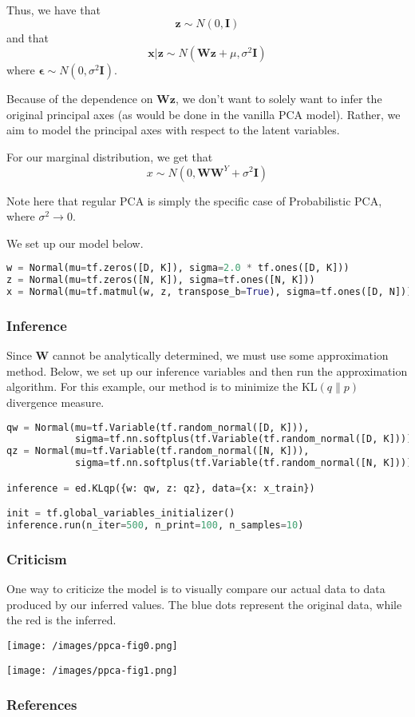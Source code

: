 Thus, we have that $$\mathbf{z} \sim N(0, \mathbf{I})$$ and that $$\mathbf{x} \vert \mathbf{z} \sim N(\mathbf{Wz} + \mu, \sigma^2\mathbf{I})$$ where $\mathbf{\epsilon} \sim N(0, \sigma^2\mathbf{I})$.

Because of the dependence on $\mathbf{Wz}$, we don't want to solely want to infer the original principal axes (as would be done in the vanilla PCA model). Rather, we aim to model the principal axes with respect to the latent variables.

For our marginal distribution, we get that $$x \sim N(0, \mathbf{W}\mathbf{W}^Y + \sigma^2\mathbf{I})$$

Note here that regular PCA is simply the specific case of Probabilistic PCA, where $\sigma^2 \to 0$.

We set up our model below.

\begin{lstlisting}[language=Python]
w = Normal(mu=tf.zeros([D, K]), sigma=2.0 * tf.ones([D, K]))
z = Normal(mu=tf.zeros([N, K]), sigma=tf.ones([N, K]))
x = Normal(mu=tf.matmul(w, z, transpose_b=True), sigma=tf.ones([D, N]))

\end{lstlisting}

\subsubsection{Inference}

Since $\mathbf{W}$ cannot be analytically determined, we must use some approximation method. Below, we set up our inference variables and then run the approximation algorithm. For this example, our method is to minimize the $\text{KL}(q\|p)$ divergence measure.

\begin{lstlisting}[language=Python]
qw = Normal(mu=tf.Variable(tf.random_normal([D, K])),
            sigma=tf.nn.softplus(tf.Variable(tf.random_normal([D, K]))))
qz = Normal(mu=tf.Variable(tf.random_normal([N, K])),
            sigma=tf.nn.softplus(tf.Variable(tf.random_normal([N, K]))))

inference = ed.KLqp({w: qw, z: qz}, data={x: x_train})

init = tf.global_variables_initializer()
inference.run(n_iter=500, n_print=100, n_samples=10)
\end{lstlisting}

\subsubsection{Criticism}

One way to criticize the model is to visually compare our actual data to data produced by our inferred values. The blue dots represent the original data, while the red is the inferred.

\texttt{[image: /images/ppca-fig0.png]}

\texttt{[image: /images/ppca-fig1.png]}

\subsubsection{References}\label{references}
